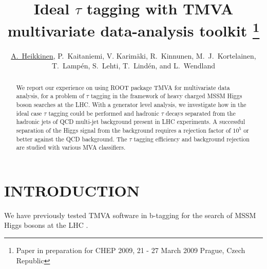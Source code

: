 \documentclass[twoside,floatfix,a4wide]{revtex4}
\begin{document}
\title{Ideal $\tau$ tagging with TMVA multivariate data-analysis toolkit
\footnote{Paper \cite{ah09bProceedings} in preparation for CHEP 2009, 21 - 27 March 2009 Prague, 
Czech Republic}}

\author{\underline{A.~Heikkinen}, P.~Kaitaniemi, V. Karim\"{a}ki,
 R.~Kinnunen,  M.~J.~Kortelainen, T.~Lamp\'{e}n, S.~Lehti, T.~Lind\'{e}n, and L.~Wendland} 

\begin{abstract}
We report our experience on using ROOT package TMVA for
multivariate data analysis, for a problem of $\tau$ tagging in the
framework of heavy charged MSSM Higgs boson searches at the LHC.
With a generator level analysis, 
we investigate how in the ideal case $\tau$ tagging could be performed and 
hadronic $\tau$ decays separated from the
hadronic jets of QCD multi-jet background present in LHC experiments. 
A successful separation of the Higgs signal from the background 
requires a rejection factor of $10^5$ or better against the QCD background. 
The $\tau$ tagging efficiency and background rejection are studied with various MVA classifiers.


\end{abstract}

\maketitle


\tableofcontents

\thispagestyle{fancy}

\section{INTRODUCTION \label{section:intro}}
We have previously tested TMVA software in b-tagging for the search of MSSM Higgs bosons 
at the LHC \cite{heikkinen07lProceedings}.
\end{document}

